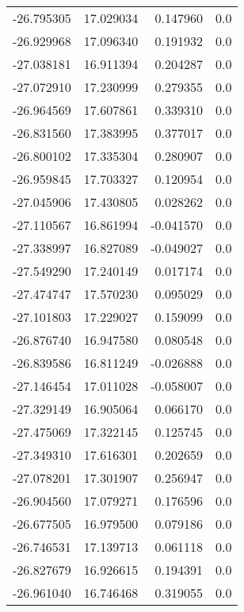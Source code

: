 \begin{tabular}{rrrr}
      -26.795305 &        17.029034 &    0.147960 &   0.0 \\
      -26.929968 &        17.096340 &    0.191932 &   0.0 \\
      -27.038181 &        16.911394 &    0.204287 &   0.0 \\
      -27.072910 &        17.230999 &    0.279355 &   0.0 \\
      -26.964569 &        17.607861 &    0.339310 &   0.0 \\
      -26.831560 &        17.383995 &    0.377017 &   0.0 \\
      -26.800102 &        17.335304 &    0.280907 &   0.0 \\
      -26.959845 &        17.703327 &    0.120954 &   0.0 \\
      -27.045906 &        17.430805 &    0.028262 &   0.0 \\
      -27.110567 &        16.861994 &   -0.041570 &   0.0 \\
      -27.338997 &        16.827089 &   -0.049027 &   0.0 \\
      -27.549290 &        17.240149 &    0.017174 &   0.0 \\
      -27.474747 &        17.570230 &    0.095029 &   0.0 \\
      -27.101803 &        17.229027 &    0.159099 &   0.0 \\
      -26.876740 &        16.947580 &    0.080548 &   0.0 \\
      -26.839586 &        16.811249 &   -0.026888 &   0.0 \\
      -27.146454 &        17.011028 &   -0.058007 &   0.0 \\
      -27.329149 &        16.905064 &    0.066170 &   0.0 \\
      -27.475069 &        17.322145 &    0.125745 &   0.0 \\
      -27.349310 &        17.616301 &    0.202659 &   0.0 \\
      -27.078201 &        17.301907 &    0.256947 &   0.0 \\
      -26.904560 &        17.079271 &    0.176596 &   0.0 \\
      -26.677505 &        16.979500 &    0.079186 &   0.0 \\
      -26.746531 &        17.139713 &    0.061118 &   0.0 \\
      -26.827679 &        16.926615 &    0.194391 &   0.0 \\
      -26.961040 &        16.746468 &    0.319055 &   0.0 \\

\end{tabular}
